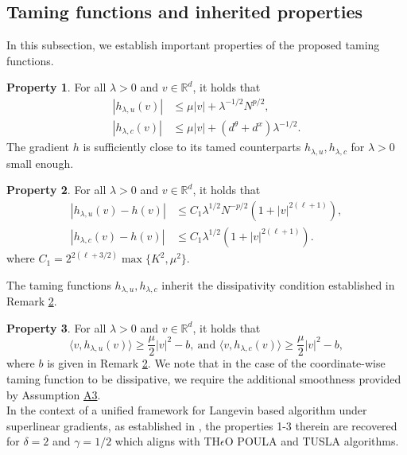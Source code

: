 \documentclass[a4paper, 10pt]{article}
\theoremstyle{plain}%
\begin{document}
\subsection{Taming functions and inherited properties}
In this subsection, we establish important properties of the proposed taming functions.\\ \hypertarget{Property1}{}
\par \noindent \textbf{Property 1}. For all $\lambda>0$ and  $v\in\mathbb{R}^{d}$, it holds that 
\begin{align*}
|h_{\lambda,u}(v)|&\leq \mu|v|+{\lambda}^{-1/2}N^{p/2},\\
|h_{\lambda,c}(v)|&\leq \mu|v|+(d^{\theta}+d^x){\lambda}^{-1/2}.
\end{align*}
\noindent The gradient $h$ is sufficiently close to its tamed counterparts $h_{\lambda,u}, h_{\lambda,c}$ for $\lambda>0$ small enough.\\ 
\hypertarget{Property2}{} 
\par \noindent \textbf{Property 2}. For all $\lambda>0$ and  $v\in\mathbb{R}^{d}$, it holds that
\begin{align*}
|h_{\lambda,u}(v)-h(v)|&\leq C_1{\lambda}^{1/2}N^{-p/2}(1+|v|^{2(\ell+1)}),\\
|h_{\lambda,c}(v)-h(v)|&\leq C_1{\lambda}^{1/2}(1+|v|^{2(\ell+1)}).    
\end{align*}
\noindent where $C_1=2^{2(\ell+3/2)}\max\{K^2,\mu^2\}$.\\
\par \noindent The taming functions $h_{\lambda,u}, h_{\lambda,c}$ inherit the dissipativity condition established in Remark \hyperlink{Remark2}{2}.\\ 
\hypertarget{Property3}{}
\par \noindent \textbf{Property 3}. For all $\lambda>0$ and  $v\in\mathbb{R}^{d}$, it holds that $$\langle v,h_{\lambda,u}(v)\rangle\geq \dfrac{\mu}{2}|v|^2-b,\ \text{and } \langle v,h_{\lambda,c}(v)\rangle\geq \dfrac{\mu}{2}|v|^2-b,$$
\noindent where $b$ is given in Remark \hyperlink{Remark2}{2}. We note that in the case of the coordinate-wise taming function to be dissipative, we require the additional smoothness provided by Assumption \hyperlink{Assum3a}{A3}.\\\newline In the context of a unified framework for Langevin based algorithm under superlinear gradients, as established in \cite{lim2021polygonal}, the properties 1-3 therein are recovered for $\delta=2$ and $\gamma=1/2$ which aligns with TH$\epsilon$O POULA \cite{lim2023langevin} and TUSLA \cite{lovas2023taming} algorithms.
\end{document}
